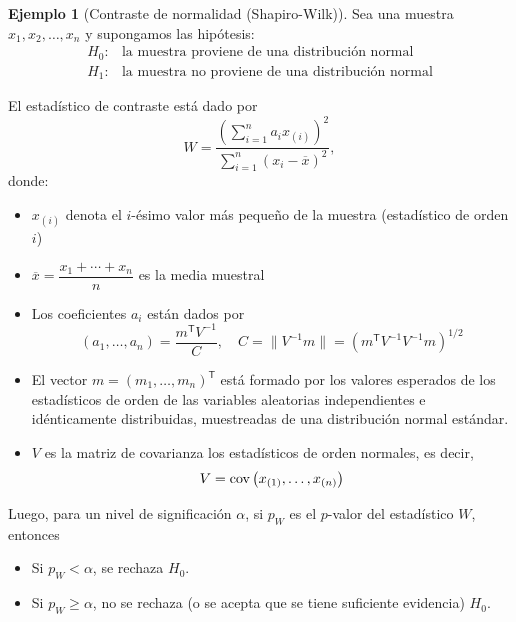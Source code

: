 \documentclass[11pt,a4paper]{book}
\theoremstyle{definition}%
\newtheorem{ejemplo}[teorema]{Ejemplo}
\begin{document}
            \begin{ejemplo}[Contraste de normalidad (Shapiro-Wilk)]\label{shapiro wilk}
                Sea una muestra \(x_{1}, x_{2}, \ldots, x_{n}\) y supongamos las hipótesis:
                \[
                \begin{split}
                    H_{0}: &\text{la muestra proviene de una distribución normal}\\
                    H_{1}: &\text{la muestra no proviene de una distribución normal}
                \end{split}
                \]
                
                El estadístico de contraste está dado por
                    \begin{equation*}
                        W = \frac{\left( \sum_{i=1}^{n} a_i x_{(i)} \right)^{2}}{\sum_{i=1}^{n} (x_i - \overline{x})^{2}},
                    \end{equation*}
                    donde:
                    \begin{itemize}
                        \item $x_{(i)}$  denota el $i$-ésimo valor más pequeño de la muestra (estadístico de orden $i$)
                        
                        \item $\overline{x} = \dfrac{x_{1}+\cdots+x_{n}}{n}$ es la media muestral
                        
                        \item Los coeficientes $a_i$ están dados por
                        \[
                            (a_{1},\dots,a_{n}) = \frac{m^{\mathsf{T}} V^{-1}}{C}, \quad
                            C = \| V^{-1} m \| = \left( m^{\mathsf{T}} V^{-1} V^{-1} m \right)^{1/2}
                        \]
                        
                        \item El vector $m = (m_{1},\dots,m_{n})^{\mathsf{T}}$ está formado por los valores esperados de los estadísticos de orden 
                        de las variables aleatorias independientes e idénticamente distribuidas, muestreadas de una distribución normal estándar.
                        
                        \item $V$ es la matriz de covarianza los estadísticos de orden normales, es decir, $$V=\textup{cov}\left(x_{(1)},\dots,x_{(n)}\right)$$
                    \end{itemize}
                Luego, para un nivel de significación \(\alpha\), si $p_W$ es el $p$-valor del estadístico \(W\), entonces
                \begin{itemize}
                    \item Si \(p_W < \alpha\), se rechaza $H_{0}$.
                    \item Si \(p_W \geq \alpha\), no se rechaza (o se acepta que se tiene suficiente evidencia) $H_{0}$.
                \end{itemize}
            \end{ejemplo}
\end{document}
